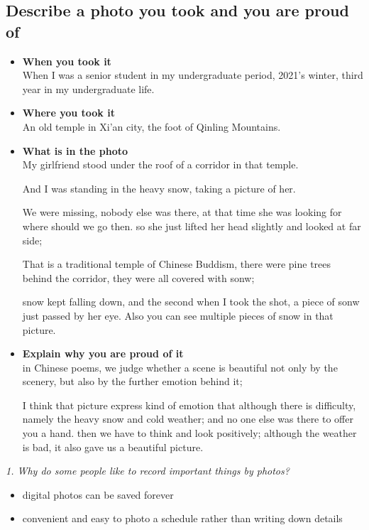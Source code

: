 \documentclass[conference]{IEEEtran}
\begin{document}
\subsection{Describe a photo you took and you are proud of}

\begin{itemize}
    \item \textbf{When you took it}\\
    When I was a senior student in my undergraduate period, 2021's winter, 
    third year in my undergraduate life.

    \item \textbf{Where you took it}\\
    An old temple in Xi'an city, the foot of Qinling Mountains.

    \item \textbf{What is in the photo}\\
    My girlfriend stood under the roof of a corridor in that temple.

    And I was standing in the heavy snow, taking a picture of her.
    
    We were missing, nobody else was there, at that time she was looking for where should we go then.
    so she just lifted her head slightly and looked at far side;

    That is a traditional temple of Chinese Buddism, there were pine trees behind the corridor, 
    they were all covered with sonw;
    
    snow kept falling down, and the second when I took the shot, a piece of sonw just passed by her eye. 
    Also you can see multiple pieces of snow in that picture. 
    
    \item \textbf{Explain why you are proud of it}\\
    in Chinese poems, we judge whether a scene is beautiful not only by the scenery, but also by the further emotion behind it;
    
    I think that picture express kind of emotion that although there is difficulty, namely the heavy snow and cold weather;
    and no one else was there to offer you a hand.
    then we have to think and look positively; although the weather is bad, it also gave us a beautiful picture.
\end{itemize}

\textit{1. Why do some people like to record important things by photos?}

\begin{itemize}
    \item  digital photos can be saved forever
    \item  convenient and easy to photo a schedule rather than writing down details
\end{itemize}
\end{document}
